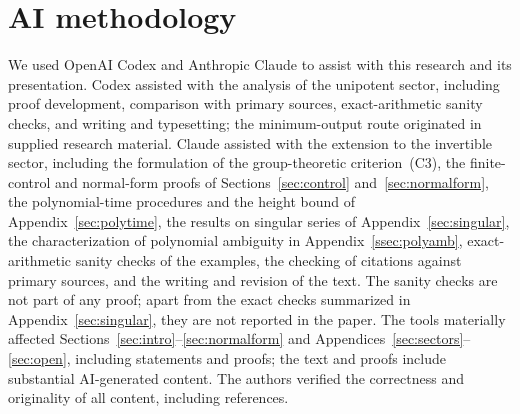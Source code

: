 \documentclass[11pt,letterpaper]{article}
\theoremstyle{definition}
\begin{document}
\section*{AI methodology}
We used OpenAI Codex and Anthropic Claude to assist with this research and its presentation. Codex assisted with the analysis of the unipotent sector, including proof development, comparison with primary sources, exact-arithmetic sanity checks, and writing and typesetting; the minimum-output route originated in supplied research material. Claude assisted with the extension to the invertible sector, including the formulation of the group-theoretic criterion~(C3), the finite-control and normal-form proofs of Sections~\ref{sec:control} and~\ref{sec:normalform}, the polynomial-time procedures and the height bound of Appendix~\ref{sec:polytime}, the results on singular series of Appendix~\ref{sec:singular}, the characterization of polynomial ambiguity in Appendix~\ref{ssec:polyamb}, exact-arithmetic sanity checks of the examples, the checking of citations against primary sources, and the writing and revision of the text. The sanity checks are not part of any proof; apart from the exact checks summarized in Appendix~\ref{sec:singular}, they are not reported in the paper. The tools materially affected Sections~\ref{sec:intro}--\ref{sec:normalform} and Appendices~\ref{sec:sectors}--\ref{sec:open}, including statements and proofs; the text and proofs include substantial AI-generated content. The authors verified the correctness and originality of all content, including references.

\providecommand{\bibfont}{}\renewcommand{\bibfont}{\normalfont\normalsize}


\end{document}
